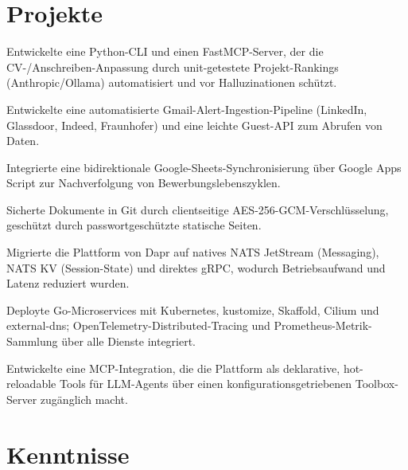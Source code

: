 \documentclass[10pt,a4paper]{resume}
\begin{document}
\section{Projekte}

\bullets
  \item Entwickelte eine Python-CLI und einen FastMCP-Server, der die CV-/Anschreiben-Anpassung durch unit-getestete Projekt-Rankings (Anthropic/Ollama) automatisiert und vor Halluzinationen schützt.
  \item Entwickelte eine automatisierte Gmail-Alert-Ingestion-Pipeline (LinkedIn, Glassdoor, Indeed, Fraunhofer) und eine leichte Guest-API zum Abrufen von Daten.
  \item Integrierte eine bidirektionale Google-Sheets-Synchronisierung über Google Apps Script zur Nachverfolgung von Bewerbungslebenszyklen.
  \item Sicherte Dokumente in Git durch clientseitige AES-256-GCM-Verschlüsselung, geschützt durch passwortgeschützte statische Seiten.
\bulletsend
\vspace{1.0pt}
\bullets
  \item Migrierte die Plattform von Dapr auf natives NATS JetStream (Messaging), NATS KV (Session-State) und direktes gRPC, wodurch Betriebsaufwand und Latenz reduziert wurden.
  \item Deployte Go-Microservices mit Kubernetes, kustomize, Skaffold, Cilium und external-dns; OpenTelemetry-Distributed-Tracing und Prometheus-Metrik-Sammlung über alle Dienste integriert.
  \item Entwickelte eine MCP-Integration, die die Plattform als deklarative, hot-reloadable Tools für LLM-Agents über einen konfigurationsgetriebenen Toolbox-Server zugänglich macht.
\bulletsend

\section{Kenntnisse}
\end{document}
